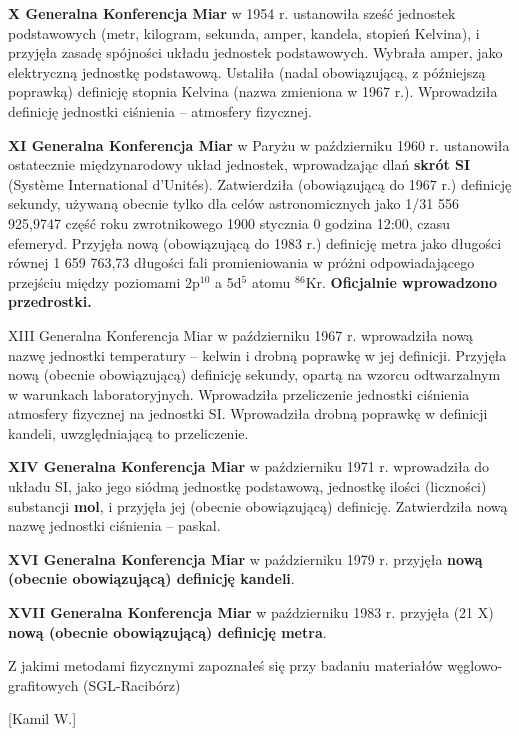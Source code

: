 \documentclass{article}
\begin{document}
\begin{enumerate}
{\bf X Generalna Konferencja Miar} w 1954 r. ustanowiła sześć jednostek podstawowych (metr, kilogram, sekunda, amper, kandela, stopień Kelvina), i przyjęła zasadę spójności układu jednostek podstawowych. Wybrała amper, jako elektryczną jednostkę podstawową. Ustaliła (nadal obowiązującą, z późniejszą poprawką) definicję stopnia Kelvina (nazwa zmieniona w 1967 r.). Wprowadziła definicję jednostki ciśnienia – atmosfery fizycznej.

{\bf XI Generalna Konferencja Miar} w Paryżu w październiku 1960 r. ustanowiła ostatecznie międzynarodowy układ jednostek, wprowadzając dlań {\bf skrót SI} (Système International d'Unités). Zatwierdziła (obowiązującą do 1967 r.) definicję sekundy, używaną obecnie tylko dla celów astronomicznych jako 1/31 556 925,9747 część roku zwrotnikowego 1900 stycznia 0 godzina 12:00, czasu efemeryd. Przyjęła nową (obowiązującą do 1983 r.) definicję metra jako długości równej 1 659 763,73 długości fali promieniowania w próżni odpowiadającego przejściu między poziomami $2$p$^{10}$ a 5d$^5$ atomu $^{86}$Kr. {\bf Oficjalnie wprowadzono przedrostki.}


XIII Generalna Konferencja Miar w październiku 1967 r. wprowadziła nową nazwę jednostki temperatury – kelwin i drobną poprawkę w jej definicji. Przyjęła nową (obecnie obowiązującą) definicję sekundy, opartą na wzorcu odtwarzalnym w warunkach laboratoryjnych. Wprowadziła przeliczenie jednostki ciśnienia atmosfery fizycznej na jednostki SI. Wprowadziła drobną poprawkę w definicji kandeli, uwzględniającą to przeliczenie.

{\bf XIV Generalna Konferencja Miar} w październiku 1971 r. wprowadziła do układu SI, jako jego siódmą jednostkę podstawową, jednostkę ilości (liczności) substancji {\bf mol}, i przyjęła jej (obecnie obowiązującą) definicję. Zatwierdziła nową nazwę jednostki ciśnienia – paskal.

{\bf XVI Generalna Konferencja Miar} w październiku 1979 r. przyjęła {\bf nową (obecnie obowiązującą) definicję kandeli}.

{\bf XVII Generalna Konferencja Miar} w październiku 1983 r. przyjęła (21 X) {\bf nową (obecnie obowiązującą) definicję metra}.

 
 




{\Large \bf  \item Z jakimi metodami fizycznymi zapoznałeś się przy badaniu materiałów węglowo-
grafitowych (SGL-Racibórz)} [Kamil W.]
\end{enumerate}
\end{document}
